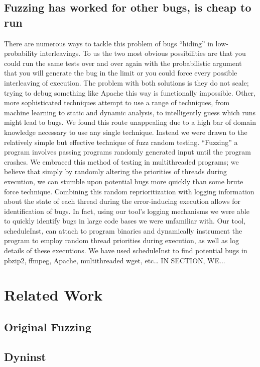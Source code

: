 \documentclass[10pt,]{article} %
\begin{document}
\subsection{Fuzzing has worked for other bugs, is cheap to run}

There are numerous ways to tackle this problem of bugs “hiding” in low-probability interleavings.
  To us the two most obvious possibilities are that you could run the same tests over and over again with the probabilistic argument that you will generate the bug in the limit or you could force every possible interleaving of execution.
  The problem with both solutions is they do not scale; trying to debug something like Apache this way is functionally impossible. 
 Other, more sophisticated techniques attempt to use a range of techniques, from machine learning to static and dynamic analysis, to intelligently guess which runs might lead to bugs. 
 We found this route unappealing due to a high bar of domain knowledge necessary to use any single technique. 
 Instead we were drawn to the relatively simple but effective technique of fuzz random testing.
  “Fuzzing” a program involves passing programs randomly generated input until the program crashes. 
 We embraced this method of testing in multithreaded programs; we believe that simply by randomly altering the priorities of threads during execution, we can stumble upon potential bugs more quickly than some brute force technique.
  Combining this random reprioritization with logging information about the state of each thread during the error-inducing execution allows for identification of bugs.
  In fact, using our tool’s logging mechanisms we were able to quickly identify bugs in large code bases we were unfamiliar with.  
Our tool, scheduleInst, can attach to program binaries and dynamically instrument the program to employ random thread priorities during execution, as well as log details of these executions.
 We have used scheduleInst to find potential bugs in pbzip2, ffmpeg, Apache, multithreaded wget, etc…  IN SECTION, WE...


\section{Related Work}


\subsection{Original Fuzzing}

\subsection{Dyninst}
\end{document}
